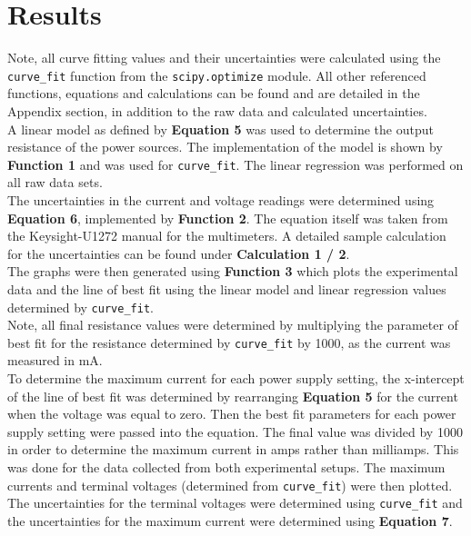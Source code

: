 \documentclass[
	letterpaper, %
	10pt, %
]{CSUniSchoolLabReport}
\begin{document}
\section{Results}
Note, all curve fitting values and their uncertainties were calculated using the \lstinline{curve_fit} function from the \lstinline{scipy.optimize} module. All other referenced functions, equations and calculations can be found and are detailed in the Appendix section, in addition to the raw data and calculated uncertainties.\\

A linear model as defined by \textbf{Equation 5} was used to determine the output resistance of the power sources. The implementation of the model is shown by \textbf{Function 1} and was used for \lstinline{curve_fit}. The linear regression was performed on all raw data sets.\\

The uncertainties in the current and voltage readings were determined using \textbf{Equation 6}, implemented by \textbf{Function 2}. The equation itself was taken from the Keysight-U1272 manual for the multimeters. A detailed sample calculation for the uncertainties can be found under \textbf{Calculation 1 / 2}.\\

The graphs were then generated using \textbf{Function 3} which plots the experimental data and the line of best fit using the linear model and linear regression values determined by \lstinline{curve_fit}.\\

Note, all final resistance values were determined by multiplying the parameter of best fit for the resistance  determined by \lstinline{curve_fit} by 1000, as the current was measured in mA.\\

To determine the maximum current for each power supply setting, the x-intercept of the line of best fit was determined by rearranging \textbf{Equation 5} for the current when the voltage was equal to zero. Then the best fit parameters for each power supply setting were passed into the equation. The final value was divided  by 1000 in order to determine the maximum current in amps rather than milliamps. This was done for the data collected from both experimental setups. The maximum currents and terminal voltages (determined from \lstinline{curve_fit}) were then plotted. The uncertainties for the terminal voltages were determined using \lstinline{curve_fit} and the uncertainties for the maximum current were determined using \textbf{Equation 7}.

\newpage
\end{document}
